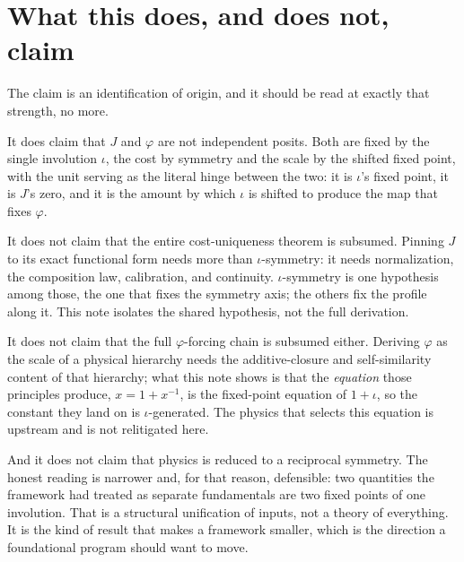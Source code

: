 \documentclass[11pt,a4paper]{article}
\theoremstyle{definition}
\theoremstyle{remark}
\begin{document}
\section{What this does, and does not, claim}

The claim is an identification of origin, and it should be read at exactly that
strength, no more.

It does claim that $J$ and $\varphi$ are not independent posits. Both are fixed by
the single involution $\iota$, the cost by symmetry and the scale by the shifted
fixed point, with the unit serving as the literal hinge between the two: it is
$\iota$'s fixed point, it is $J$'s zero, and it is the amount by which $\iota$ is
shifted to produce the map that fixes $\varphi$.

It does not claim that the entire cost-uniqueness theorem is subsumed. Pinning $J$
to its exact functional form needs more than $\iota$-symmetry: it needs
normalization, the composition law, calibration, and continuity. $\iota$-symmetry
is one hypothesis among those, the one that fixes the symmetry axis; the others
fix the profile along it. This note isolates the shared hypothesis, not the full
derivation.

It does not claim that the full $\varphi$-forcing chain is subsumed either. Deriving
$\varphi$ as the scale of a physical hierarchy needs the additive-closure and
self-similarity content of that hierarchy; what this note shows is that the
\emph{equation} those principles produce, $x=1+x^{-1}$, is the fixed-point equation
of $1+\iota$, so the constant they land on is $\iota$-generated. The physics that
selects this equation is upstream and is not relitigated here.

And it does not claim that physics is reduced to a reciprocal symmetry. The honest
reading is narrower and, for that reason, defensible: two quantities the framework
had treated as separate fundamentals are two fixed points of one involution. That
is a structural unification of inputs, not a theory of everything. It is the kind
of result that makes a framework smaller, which is the direction a foundational
program should want to move.
\end{document}
